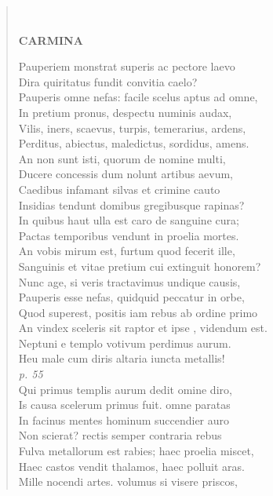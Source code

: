 \documentclass[11pt, a4paper]{report}
\begin{document}
\begin{verse}
        ﻿\pagebreak 
     \marginpar{[92]} \begin{center} \textbf{CARMINA} \end{center}Pauperiem monstrat superis ac pectore laevo \\ Dira quiritatus fundit convitia caelo? \\ Pauperis omne nefas: facile scelus aptus ad omne, \\ In pretium pronus, despectu numinis audax, \\ Vilis, iners, scaevus, turpis, temerarius, ardens, \\ Perditus, abiectus, maledictus, sordidus, amens. \\ An non sunt isti, quorum de nomine multi, \\ Ducere concessis dum nolunt artibus aevum, \\ Caedibus infamant silvas et crimine cauto \\ Insidias tendunt domibus gregibusque rapinas? \\ In quibus haut ulla est caro de sanguine cura; \\ Pactas temporibus vendunt in proelia mortes. \\ An vobis mirum est, furtum quod fecerit ille, \\ Sanguinis et vitae pretium cui extinguit honorem? \\ Nunc age, si veris tractavimus undique causis, \\ Pauperis esse nefas, quidquid peccatur in orbe, \\ Quod superest, positis iam rebus ab ordine primo \\ An vindex sceleris sit raptor  \lbrack et ipse \rbrack , videndum est. \\ Neptuni e templo votivum perdimus aurum. \\ Heu male cum diris altaria iuncta metallis! \\ \textit{p. 55} \\ Qui primus templis aurum dedit omine diro, \\ Is causa scelerum primus fuit. omne paratas \\ In facinus mentes hominum succendier auro \\ Non scierat? rectis semper contraria rebus \\ Fulva metallorum est rabies; haec proelia miscet, \\ Haec castos vendit thalamos, haec polluit aras. \\ Mille nocendi artes. volumus si visere priscos, \\ 

\end{verse}
\end{document}
